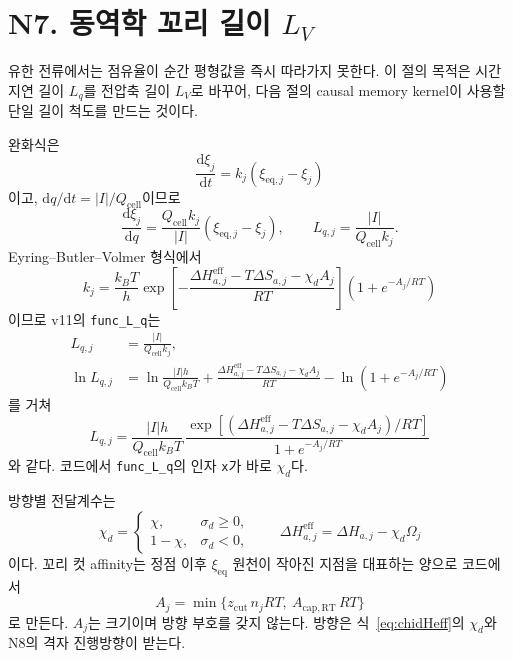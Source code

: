 \documentclass[11pt,a4paper]{article}
\newcommand{\dd}{\mathrm{d}}
\newcommand{\eq}{\mathrm{eq}}
\newcommand{\eff}{\mathrm{eff}}
\newcommand{\cell}{\mathrm{cell}}
\begin{document}
\section{N7. 동역학 꼬리 길이 $L_V$}\label{sec:N7}
유한 전류에서는 점유율이 순간 평형값을 즉시 따라가지 못한다. 이 절의 목적은 시간 지연 길이 $L_q$를 전압축 길이 $L_V$로 바꾸어, 다음 절의 causal memory kernel이 사용할 단일 길이 척도를 만드는 것이다.

완화식은
\begin{equation}
\frac{\dd \xi_j}{\dd t}=k_j(\xi_{\eq,j}-\xi_j)
\label{eq:relax}
\end{equation}
이고, $\dd q/\dd t=|I|/Q_{\cell}$이므로
\begin{equation}
\frac{\dd \xi_j}{\dd q}=\frac{Q_{\cell}k_j}{|I|}(\xi_{\eq,j}-\xi_j),
\qquad
L_{q,j}=\frac{|I|}{Q_{\cell}k_j}.
\label{eq:Lqdef}
\end{equation}
Eyring--Butler--Volmer 형식에서
\begin{equation}
k_j=\frac{k_BT}{h}
\exp\!\left[-\frac{\Delta H_{a,j}^{\eff}-T\Delta S_{a,j}-\chi_d A_j}{RT}\right]
\left(1+e^{-A_j/RT}\right)
\label{eq:kuniv}
\end{equation}
이므로 v11의 \texttt{func\_L\_q}는
\begin{align}
L_{q,j}
&=\frac{|I|}{Q_{\cell}k_j},\label{eq:Lqfromk}\\
\ln L_{q,j}
&=\ln\frac{|I|h}{Q_{\cell}k_BT}
+\frac{\Delta H_{a,j}^{\eff}-T\Delta S_{a,j}-\chi_d A_j}{RT}
-\ln\!\left(1+e^{-A_j/RT}\right)
\label{eq:lnLqintermediate}
\end{align}
를 거쳐
\begin{equation}
\boxed{\;
L_{q,j}=
\frac{|I|h}{Q_{\cell}k_BT}\,
\frac{\exp[(\Delta H_{a,j}^{\eff}-T\Delta S_{a,j}-\chi_d A_j)/RT]}
{1+e^{-A_j/RT}}\;}
\label{eq:Lq}
\end{equation}
와 같다. 코드에서 \texttt{func\_L\_q}의 인자 \texttt{x}가 바로 $\chi_d$다.

방향별 전달계수는
\begin{equation}
\boxed{\;\chi_d=
\begin{cases}
\chi,&\sigma_d\ge0,\\
1-\chi,&\sigma_d<0,
\end{cases}
\qquad
\Delta H_{a,j}^{\eff}=\Delta H_{a,j}-\chi_d\Omega_j\;}
\label{eq:chidHeff}
\end{equation}
이다. 꼬리 컷 affinity는 정점 이후 $\xi_{\eq}$ 원천이 작아진 지점을 대표하는 양으로 코드에서
\begin{equation}
A_j=\min\{z_{\mathrm{cut}}\,n_jRT,\ A_{\mathrm{cap,RT}}\,RT\}
\label{eq:Acut}
\end{equation}
로 만든다. $A_j$는 크기이며 방향 부호를 갖지 않는다. 방향은 식~\eqref{eq:chidHeff}의 $\chi_d$와 N8의 격자 진행방향이 받는다.
\end{document}
